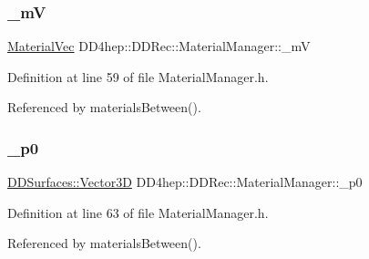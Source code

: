 \hypertarget{class_d_d4hep_1_1_d_d_rec_1_1_material_manager_ad0ce589d4286c2392a208ec8a09455e4}{}\label{class_d_d4hep_1_1_d_d_rec_1_1_material_manager_ad0ce589d4286c2392a208ec8a09455e4} 
\subsubsection{\texorpdfstring{\+\_\+mV}{\_mV}}
{\footnotesize\ttfamily \hyperlink{namespace_d_d4hep_1_1_d_d_rec_a69fdab2f851316d2b9e50956920359f7}{Material\+Vec} D\+D4hep\+::\+D\+D\+Rec\+::\+Material\+Manager\+::\+\_\+mV\hspace{0.3cm}{\ttfamily [protected]}}



Definition at line 59 of file Material\+Manager.\+h.



Referenced by materials\+Between().

\hypertarget{class_d_d4hep_1_1_d_d_rec_1_1_material_manager_a0d1a1b73cd506aa5a530dc90cf1bd88c}{}\label{class_d_d4hep_1_1_d_d_rec_1_1_material_manager_a0d1a1b73cd506aa5a530dc90cf1bd88c} 
\subsubsection{\texorpdfstring{\+\_\+p0}{\_p0}}
{\footnotesize\ttfamily \hyperlink{class_d_d_surfaces_1_1_vector3_d}{D\+D\+Surfaces\+::\+Vector3D} D\+D4hep\+::\+D\+D\+Rec\+::\+Material\+Manager\+::\+\_\+p0\hspace{0.3cm}{\ttfamily [protected]}}



Definition at line 63 of file Material\+Manager.\+h.



Referenced by materials\+Between().

\hypertarget{class_d_d4hep_1_1_d_d_rec_1_1_material_manager_a64db267d786f4371f8cf9ba5d9c805d3}{}\label{class_d_d4hep_1_1_d_d_rec_1_1_material_manager_a64db267d786f4371f8cf9ba5d9c805d3} 
